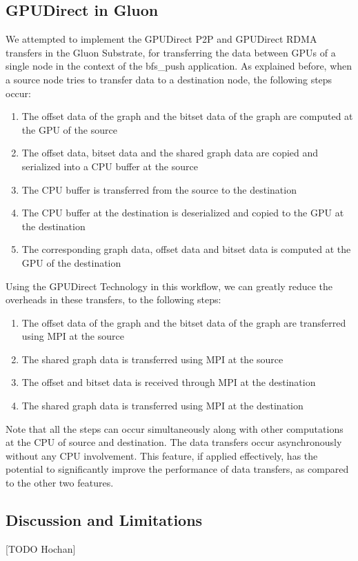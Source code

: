 \subsection{GPUDirect in Gluon}
We attempted to implement the GPUDirect P2P and GPUDirect RDMA transfers in the Gluon Substrate, for transferring the data between GPUs of a single node in the context of the bfs\_push application. As explained before, when a source node tries to transfer data to a destination node, the following steps occur:
\begin{enumerate}
\item The offset data of the graph and the bitset data of the graph are computed at the GPU of the source
\item The offset data, bitset data and the shared graph data are copied and serialized into a CPU buffer at the source
\item The CPU buffer is transferred from the source to the destination
\item The CPU buffer at the destination is deserialized and copied to the GPU at the destination
\item The corresponding graph data, offset data and bitset data is computed at the GPU of the destination
\end{enumerate}
Using the GPUDirect Technology in this workflow, we can greatly reduce the overheads in these transfers, to the following steps:
\begin{enumerate}
\item The offset data of the graph and the bitset data of the graph are transferred using MPI at the source
\item The shared graph data is transferred using MPI at the source
\item The offset and bitset data is received through MPI at the destination
\item The shared graph data is transferred using MPI at the destination
\end{enumerate}
Note that all the steps can occur simultaneously along with other computations at the CPU of source and destination. The data transfers occur asynchronously without any CPU involvement. This feature, if applied effectively, has the potential to significantly improve the performance of data transfers, as compared to the other two features.

\subsection{Discussion and Limitations}
[TODO Hochan]